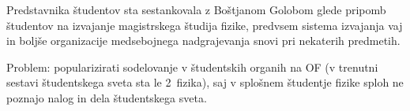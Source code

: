 \documentclass{seja}
\begin{document}
\begin{ad}
    \item Predstavnika študentov sta sestankovala z Boštjanom Golobom glede pripomb študentov na izvajanje magistrskega študija fizike, predvsem sistema izvajanja vaj in boljše organizacije medsebojnega nadgrajevanja snovi pri nekaterih predmetih.

    \item Problem: popularizirati sodelovanje v študentskih organih na OF (v trenutni sestavi študentskega sveta sta le 2~fizika), saj v splošnem študentje fizike sploh ne poznajo nalog in dela študentskega sveta.
\end{ad}
\end{document}
